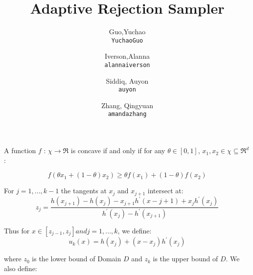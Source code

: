 \documentclass[11pt]{article}
\title{Adaptive Rejection Sampler}
\author{
  Guo,Yuchao\\
  \texttt{YuchaoGuo}
  \and
  Iverson,Alanna\\
  \texttt{alannaiverson}
  \and
  Siddiq, Auyon\\
  \texttt{auyon}
  \and
  Zhang, Qingyuan\\
  \texttt{amandazhang}
}
\begin{document}
 

\maketitle




A function $f$ : $\chi \rightarrow \Re$ is concave if and only if for any
$\theta \in [0,1]$, $x_1, x_2 \in \chi \subseteq \Re^{d}$ : \par 
$$f(\theta x_1 + (1-\theta ) x_2) \geq \theta f(x_1) + (1-\theta)f(x_2)$$

For $j = 1,...,k-1$ the tangents at $x_j$ and $x_{j+1}$ intersect at:
$$z_j = \frac{h(x_{j+1})-h(x_j)-x_{j+1} h^{'}(x-{j+1}) + x_j h^{'}(x_j)}{h^{'}(x_j)-h^{'}(x_{j+1})}$$

Thus for $x\in [z_{j-1}, z_j] and j=1,...,k$, we define:
$$u_{k}(x) = h(x_j) + (x-x_j)h^{'}(x_j)$$

where $z_0$ is the lower bound of Domain $D$ and $z_k$ is the upper bound of $D$. We also define:




\end{document}
